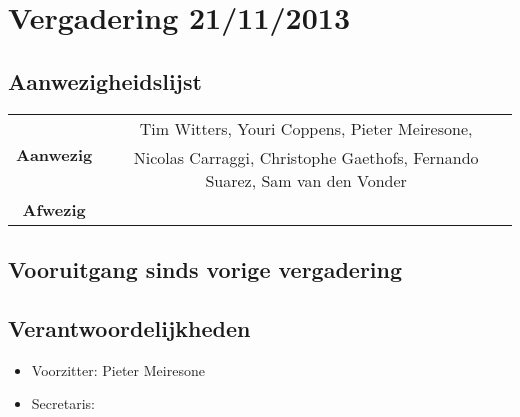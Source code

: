 \section{Vergadering 21/11/2013}
\subsection{Aanwezigheidslijst}
\begin{table}[htbp]
	\centering
	\begin{tabular}{c|c}
		\multirow{2}{*}{\textbf{Aanwezig}} & Tim Witters, Youri Coppens, Pieter Meiresone, \\
		& Nicolas Carraggi,  Christophe Gaethofs, Fernando Suarez, Sam van den Vonder \\
		\hline
		\textbf{Afwezig} & \\
	\end{tabular}
\end{table}

\subsection{Vooruitgang sinds vorige vergadering}
\subsection{Verantwoordelijkheden}
\begin{itemize}
	\item Voorzitter: Pieter Meiresone
	\item Secretaris:
\end{itemize}
